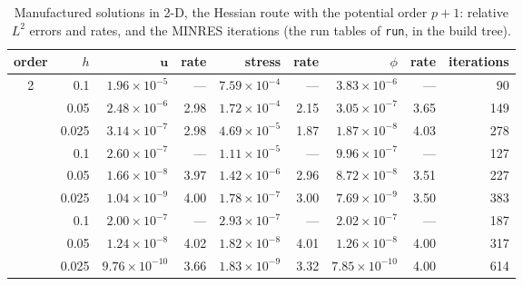 \documentclass[11pt]{article}
\numberwithin{equation}{section}
\newcommand{\vu}{\mathbf{u}}
\newcommand{\code}[1]{\texttt{#1}}
\begin{document}
\begin{table}[tp]
\centering
\small
\begin{tabular}{@{}cr rr rr rr r@{}}
\toprule
order & $h$ & $\vu$ & rate & stress & rate & $\phi$ & rate & iterations \\
\midrule
2 & 0.1   & $1.96\times10^{-5}$ & ---  & $7.59\times10^{-4}$ & ---  & $3.83\times10^{-6}$ & ---  & 90 \\
  & 0.05  & $2.48\times10^{-6}$ & 2.98 & $1.72\times10^{-4}$ & 2.15 & $3.05\times10^{-7}$ & 3.65 & 149 \\
  & 0.025 & $3.14\times10^{-7}$ & 2.98 & $4.69\times10^{-5}$ & 1.87 & $1.87\times10^{-8}$ & 4.03 & 278 \\ \addlinespace
3 & 0.1   & $2.60\times10^{-7}$ & ---  & $1.11\times10^{-5}$ & ---  & $9.96\times10^{-7}$ & ---  & 127 \\
  & 0.05  & $1.66\times10^{-8}$ & 3.97 & $1.42\times10^{-6}$ & 2.96 & $8.72\times10^{-8}$ & 3.51 & 227 \\
  & 0.025 & $1.04\times10^{-9}$ & 4.00 & $1.78\times10^{-7}$ & 3.00 & $7.69\times10^{-9}$ & 3.50 & 383 \\ \addlinespace
4 & 0.1   & $2.00\times10^{-7}$ & ---  & $2.93\times10^{-7}$ & ---  & $2.02\times10^{-7}$ & ---  & 187 \\
  & 0.05  & $1.24\times10^{-8}$ & 4.02 & $1.82\times10^{-8}$ & 4.01 & $1.26\times10^{-8}$ & 4.00 & 317 \\
  & 0.025 & $9.76\times10^{-10}$ & 3.66 & $1.83\times10^{-9}$ & 3.32 & $7.85\times10^{-10}$ & 4.00 & 614 \\
\bottomrule
\end{tabular}
\caption[Manufactured solutions in 2-D: the Hessian route]{Manufactured solutions in 2-D, the Hessian route with the
potential order $p+1$: relative $L^2$ errors and rates, and the MINRES
iterations (the run tables of \code{run}, 
in the build tree).}
\label{tab:manufactured-2d-ladder}
\end{table}
\end{document}
